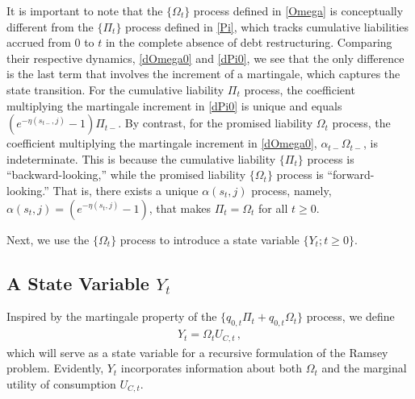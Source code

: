 \documentclass[12pt]{article}
\begin{document}
It is important to note that the $\{\Omega_t\}$ process defined in \eqref{Omega} is conceptually different from  the $\{\Pi_t\}$ process defined in \eqref{Pi}, which tracks cumulative liabilities accrued from $0$ to $t$ in the complete absence of debt restructuring.  Comparing their respective dynamics, \eqref{dOmega0} and  \eqref{dPi0},  %
we see that the only difference is the last  term that involves the increment of a martingale, which captures the state transition. For the cumulative liability $\Pi_t$ process,  the coefficient multiplying the martingale increment in   \eqref{dPi0} is unique and equals $\left(e^{-\eta(s_{t-}, j)} - 1 \right)\Pi_{t-} $. By contrast, for the promised liability $\Omega_t$ process, the coefficient multiplying the martingale increment in  \eqref{dOmega0}, $\alpha_{t-} \Omega_{t-} $, is indeterminate. This is 
because the cumulative liability $\{\Pi_t\}$ process is ``backward-looking,'' while the promised liability $\{\Omega_t\}$ process is ``forward-looking.'' That is, there  exists a unique $ \alpha(s_{t}, j) $ process, namely, $ \alpha(s_{t}, j) =\left(e^{-\eta(s_{t}, j)} - 1 \right)$, that  makes $\Pi_t = \Omega_t$ 
for all $t\geq 0$. 



Next, we use the $\{\Omega_t\}$ process to introduce a state variable $\{Y_t; t\geq 0\}$.


\subsection{A State Variable $Y_t$} \label{sec:Y}


Inspired by the martingale property of the $\{q_{0, t}\Pi_t+q_{0, t}\Omega_t\}$ process, 
we define %
\begin{align}\label{Y}
Y_t = \Omega_t U_{C, t}\, ,
\end{align}
which will serve as a state variable for a recursive formulation of the Ramsey problem. Evidently,  $Y_t$ incorporates information about both  $\Omega_t$ and the marginal utility of consumption  $U_{C, t}$. 
\end{document}

